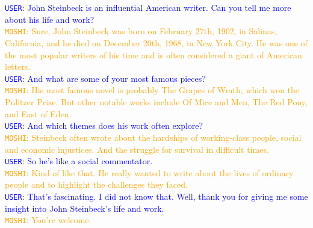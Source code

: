 \begin{tcolorbox}
\textcolor{blue}{\texttt{USER}: John Steinbeck is an influential American writer. Can you tell me more about his life and work?} \\
\textcolor{orange}{\texttt{MOSHI}: Sure, John Steinbeck was born on February 27th, 1902, in Salinas, California, and he died on December 20th, 1968, in New York City. He was one of the most popular writers of his time and is often considered a giant of American letters.} \\
\textcolor{blue}{\texttt{USER}: And what are some of your most famous pieces?} \\
\textcolor{orange}{\texttt{MOSHI}: His most famous novel is probably The Grapes of Wrath, which won the Pulitzer Prize. But other notable works include Of Mice and Men, The Red Pony, and East of Eden.} \\
\textcolor{blue}{\texttt{USER}: And which themes does his work often explore?} \\
\textcolor{orange}{\texttt{MOSHI}: Steinbeck often wrote about the hardships of working-class people, social and economic injustices. And the struggle for survival in difficult times.} \\
\textcolor{blue}{\texttt{USER}: So he's like a social commentator.} \\
\textcolor{orange}{\texttt{MOSHI}: Kind of like that. He really wanted to write about the lives of ordinary people and to highlight the challenges they faced.} \\
\textcolor{blue}{\texttt{USER}: That's fascinating. I did not know that. Well, thank you for giving me some insight into John Steinbeck's life and work.} \\
\textcolor{orange}{\texttt{MOSHI}: You're welcome.}
\end{tcolorbox}



